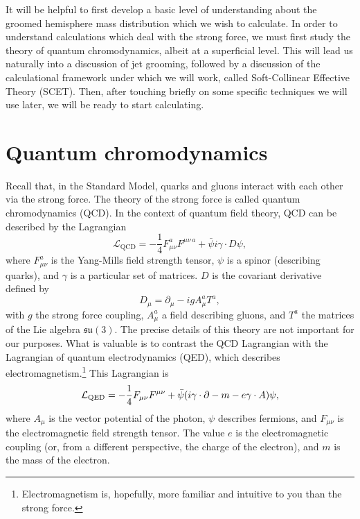 \documentclass[../thesis.tex]{subfiles}
\providecommand{\cL}{\mathcal{L}}
\providecommand{\su}{\mathfrak{su}}
\begin{document}
	It will be helpful to first develop a basic level of understanding about the groomed hemisphere mass distribution which we wish to calculate. In order to understand calculations which deal with the strong force, we must first study the theory of quantum chromodynamics, albeit at a superficial level. This will lead us naturally into a discussion of jet grooming, followed by a discussion of the calculational framework under which we will work, called Soft-Collinear Effective Theory (SCET). Then, after touching briefly on some specific techniques we will use later, we will be ready to start calculating.

\section{Quantum chromodynamics}\label{technical-sec:QCD}
	Recall that, in the Standard Model, quarks and gluons interact with each other via the strong force. The theory of the strong force is called quantum chromodynamics (QCD). In the context of quantum field theory, QCD can be described by the Lagrangian \cite{larkoski_elementary_2019-1}
	\begin{equation}\label{technical-eq:QCD Lagrangian}
		\cL_{\mathrm{QCD}} = -\frac{1}{4} F_{\mu\nu}^a F^{\mu \nu\,a} + \bar \psi i \gamma \cdot D \psi,
	\end{equation}
	where $F_{\mu\nu}^a$ is the Yang-Mills field strength tensor, $\psi$ is a spinor (describing quarks), and $\gamma$ is a particular set of matrices. $D$ is the covariant derivative defined by
	\begin{equation}
		D_\mu = \partial_\mu - i g A_\mu^a T^a,
	\end{equation}
	with $g$ the strong force coupling, $A_\mu^a$ a field describing gluons, and $T^a$ the matrices of the Lie algebra $\su(3)$. The precise details of this theory are not important for our purposes. What is valuable is to contrast the QCD Lagrangian with the Lagrangian of quantum electrodynamics (QED), which describes electromagnetism.\footnote{Electromagnetism is, hopefully, more familiar and intuitive to you than the strong force.} This Lagrangian is \cite{larkoski_elementary_2019-1}
	\begin{equation}\label{technical-eq:QED Lagrangian}
		\cL_{\mathrm{QED}} = -\frac{1}{4} F_{\mu\nu} F^{\mu \nu} + \bar \psi \qty(i \gamma \cdot \partial - m - e\gamma \cdot A)\psi,
	\end{equation}
	where $A_\mu$ is the vector potential of the photon, $\psi$ describes fermions, and $F_{\mu\nu}$ is the electromagnetic field strength tensor. The value $e$ is the electromagnetic coupling (or, from a different perspective, the charge of the electron), and $m$ is the mass of the electron.
\end{document}
